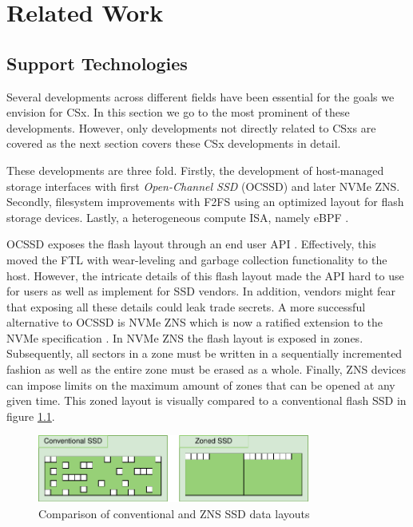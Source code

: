 
\chapter{Related Work} %

\section{Support Technologies}

Several developments across different fields have been essential for the
goals we envision for CSx. In this section we go to the most prominent of 
these developments. However, only developments not directly related to CSxs are
covered as the next section covers these CSx developments in detail.

These developments are three fold. Firstly, the development of host-managed
storage interfaces with first \textit{Open-Channel SSD} (OCSSD)
\cite{Bjrling2017LightNVMTL} and later NVMe ZNS. Secondly, filesystem
improvements with F2FS \cite{Lee2015F2FSAN} using an optimized layout for flash
storage devices. Lastly, a heterogeneous compute ISA, namely eBPF
\cite{ebpf_cs_2021, kourtis2020safe, bpf-uapi}.

OCSSD exposes the flash layout through an end user API \cite{liblightnvm}.
Effectively, this moved the FTL with wear-leveling and garbage collection
functionality to the host. However, the intricate details of this flash layout
made the API hard to use for users as well as implement for SSD vendors. In
addition, vendors might fear that exposing all these details could leak trade
secrets. A more successful alternative to OCSSD is NVMe ZNS which is now a
ratified extension to the NVMe specification \cite{nvme-zns}. In NVMe ZNS the
flash layout is exposed in zones. Subsequently, all sectors in a zone must be
written in a sequentially incremented fashion as well as the entire zone must
be erased as a whole. Finally, ZNS devices can impose limits on the maximum
amount of zones that can be opened at any given time. This zoned layout is
visually compared to a conventional flash SSD in figure \ref{figure:znslayout}.

\begin{figure}[H]
    \centering
	\includegraphics[width=0.8\textwidth]{resources/images/zns-vs-conventional-layout.pdf}
	\caption{Comparison of conventional and ZNS SSD data layouts}
    \label{figure:znslayout}
\end{figure}


